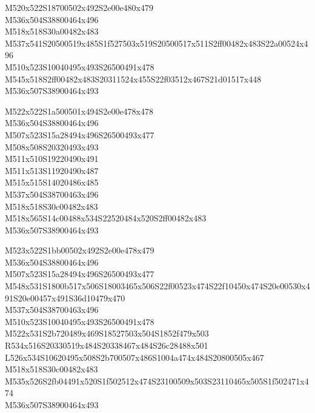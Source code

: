 \documentclass{article}
\begin{document}
\begin{multicols}{5}
\begin{center}

M520x522S18700502x492S2e00e480x479 %
\\M536x504S38800464x496 %
\\M518x518S30a00482x483 %
\\M537x541S20500519x485S1f527503x519S20500517x511S2ff00482x483S22a00524x496 %
\\M510x523S10040495x493S26500491x478 %
\\M545x518S2ff00482x483S20311524x455S22f03512x467S21d01517x448 %
\\M536x507S38900464x493 %
\vfil
\columnbreak

M522x522S1a500501x494S2e00e478x478 %
\\M536x504S38800464x496 %
\\M507x523S15a28494x496S26500493x477 %
\\M508x508S20320493x493 %
\\M511x510S19220490x491 %
\\M511x513S11920490x487 %
\\M515x515S14020486x485 %
\\M537x504S38700463x496 %
\\M518x518S30c00482x483 %
\\M518x565S14c00488x534S22520484x520S2ff00482x483 %
\\M536x507S38900464x493 %
\vfil
\columnbreak

M523x522S1bb00502x492S2e00e478x479 %
\\M536x504S38800464x496 %
\\M507x523S15a28494x496S26500493x477 %
\\M548x531S1800b517x506S18003465x506S22f00523x474S22f10450x474S20e00530x491S20e00457x491S36d10479x470 %
\\M537x504S38700463x496 %
\\M510x523S10040495x493S26500491x478 %
\\M522x531S2b720489x469S18527503x504S1852f479x503 %
\\R534x516S20330519x484S20338467x484S26c28488x501 %
\\L526x534S10620495x508S2b700507x486S1004a474x484S20800505x467 %
\\M518x518S30c00482x483 %
\\M535x526S2fb04491x520S1f502512x474S23100509x503S23110465x505S1f502471x474 %
\\M536x507S38900464x493 %
\vfil
\columnbreak


\end{center}
\end{multicols}
\end{document}
